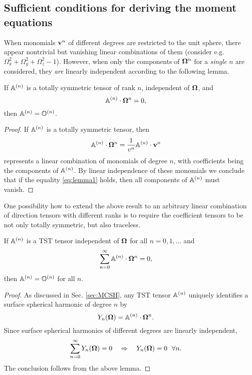 \subsection{Sufficient conditions for deriving the moment equations}
When monomials $\bv^n$ of different degrees are restricted to the unit sphere, there appear nontrivial but vanishing
linear combinations of them (consider e.g. $\Omega_x^2 + \Omega_y^2 + \Omega_z^2 - 1$). However, when only the
components of $\bomega^n$ for a \textsl{single} $n$ are considered, they \textsl{are} linearly independent according to
the following lemma.
\begin{lemma}
  If $\AA$ is a totally symmetric tensor of rank $n$, independent of $\bomega$, and
  \begin{equation}\label{eq:lemma1}
    \AA\contr\bomega^n = 0,
  \end{equation}
  then $\AA = \mathbb{O}^{(n)}$.
\end{lemma}
\begin{proof}
  If $\AA$ is a totally symmetric tensor, then 
  $$
    \AA\contr\bomega^n = \frac{1}{v^n}\AA\contr\bv^n
  $$
  represents a linear combination of monomials of degree $n$,  with coefficients being the components of $\AA$. By 
  linear independence of these monomials we conclude that if the equality \eqref{eq:lemma1} holds, then all components 
  of $\AA$ must vanish.
\end{proof}

One possibility how to extend the above result to an arbitrary linear combination of direction tensors with different
ranks is to require the coefficient tensors to be not only totally symmetric, but also traceless.

\begin{theorem}\label{thm:MC-suffcond}
  If $\AA$ is a TST tensor independent of $\bomega$ for all $n = 0,1,\ldots$ and
  $$
    \suma[n]{0}{\infty}\AA\contr\bomega^n = 0,
  $$
  then $\AA = \mathbb{O}^{(n)}$ for all $n$.
\end{theorem}
\begin{proof}
  As discussed in Sec. \ref{sec:MCSH}, any TST tensor $\AA$ uniquely identifies a surface spherical harmonic of degree 
  $n$ by 
  $$
    Y_n(\bomega) = \AA\contr\bomega^n.
  $$
  Since surface spherical harmonics of different degrees are linearly independent,
  $$
    \suma[n]{0}{\infty} Y_n(\bomega) = 0\quad \Rightarrow \quad Y_n(\bomega) = 0 \ \ \forall{n}.
  $$
  The conclusion follows from the above lemma.
\end{proof}

